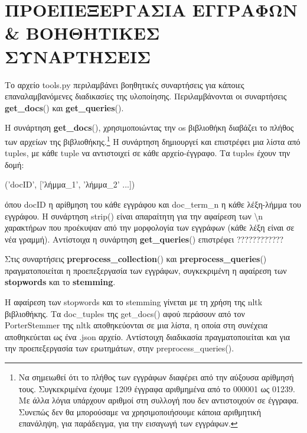 \documentclass[12pt]{report}
\begin{document}
        \section{ΠΡΟΕΠΕΞΕΡΓΑΣΙΑ ΕΓΓΡΑΦΩΝ \& ΒΟΗΘΗΤΙΚΕΣ ΣΥΝΑΡΤΗΣΕΙΣ}

            Το αρχείο {\fontCode\small tools.py} περιλαμβάνει βοηθητικές συναρτήσεις για κάποιες επαναλαμβανόμενες διαδικασίες της υλοποίησης.
            Περιλαμβάνονται οι συναρτήσεις {\fontCode\small \textbf{get\_docs}()} και {\fontCode\small \textbf{get\_queries}()}.

            Η συνάρτηση {\fontCode\small \textbf{get\_docs}()}, χρησιμοποιώντας την {\fontCode\small os} βιβλιοθήκη
            διαβάζει το πλήθος των αρχείων της βιβλιοθήκης.\footnote{Να σημειωθεί ότι το πλήθος των εγγράφων διαφέρει από την αύξουσα αρίθμησή τους. Συγκεκριμένα έχουμε 1209 έγγραφα αριθμημένα από το {\fontCode\scriptsize 000001} ως {\fontCode\scriptsize 01239}. Με άλλα λόγια υπάρχουν αριθμοί στη συλλογή που δεν αντιστοιχούν σε έγγραφα. Συνεπώς δεν θα μπορούσαμε να χρησιμοποιήσουμε κάποια αριθμητική επανάληψη, για παράδειγμα, για την εισαγωγή των εγγράφων.}
            Η συνάρτηση δημιουργεί και επιστρέφει μια λίστα από tuples, με κάθε tuple να αντιστοιχεί σε κάθε αρχείο-έγγραφο. Τα tuples έχουν την δομή:

                \begin{graycomment} \centering
                {\fontCode\footnotesize ('docID', ['λήμμα\_1', 'λήμμα\_2' ...])}
                \end{graycomment}

            \noindent όπου {\fontCode\small docID} η αρίθμηση του κάθε εγγράφου και {\fontCode\small doc\_term\_n} η κάθε λέξη-λήμμα του εγγράφου.
            Η συνάρτηση {\fontCode\small strip()} είναι απαραίτητη για την αφαίρεση των {\fontCode\small \textbackslash n} χαρακτήρων
            που προέκυψαν από την μορφολογία των εγγράφων (κάθε λέξη είναι σε νέα γραμμή).
            Αντίστοιχα η συνάρτηση {\fontCode\small \textbf{get\_queries}()} επιστρέφει ????????????

            Στις συναρτήσεις {\fontCode\small \textbf{preprocess\_collection}()} και {\fontCode\small \textbf{preprocess\_queries}()}
            πραγματοποιείται η προεπεξεργασία των εγγράφων, συγκεκριμένη η αφαίρεση των \textbf{stopwords} και το \textbf{stemming}.


            Η αφαίρεση των stopwords και το stemming γίνεται με τη χρήση της {\fontCode\small nltk} βιβλιοθήκης. Τα {\fontCode\small doc\_tuples} της
            {\fontCode\small get\_docs()} αφού περάσουν από τον {\fontCode\small PorterStemmer} της {\fontCode\small nltk} αποθηκεύονται σε μια λίστα, η οποία στη συνέχεια αποθηκεύεται ως ένα {\fontCode\small .json} αρχείο.
            Αντίστοιχη διαδικασία πραγματοποιείται και για την προεπεξεργασία των ερωτημάτων, στην {\fontCode\small preprocess\_queries()}.
\end{document}
